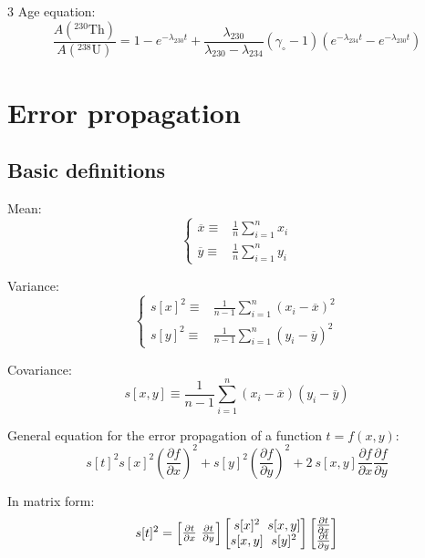 \documentclass{article}
\begin{document}
\begin{multicols}{3}
Age equation:
\begin{equation}
  \frac{A(^{230}\mbox{Th})}{A(^{238}\mbox{U})} = 1 - e^{-\lambda_{230}t} +
  \frac{\lambda_{230}}{\lambda_{230}-\lambda_{234}} (\gamma_\circ-1)
\left(e^{-\lambda_{234}t}-e^{-\lambda_{230}t}\right)
\label{eq:230238}
\end{equation}

\section{Error propagation}
\label{ch:error-propagation}

\subsection{Basic definitions}
\label{sec:summarystatistics}

Mean:
\begin{equation}
\left\{
\begin{array}{rl}
\overline{x} \equiv & \frac{1}{n} \sum_{i=1}^{n} x_i\\
\overline{y} \equiv & \frac{1}{n} \sum_{i=1}^{n} y_i
\end{array}
\right.
\label{eq:mean}
\end{equation}

Variance:
\begin{equation}
\left\{
\begin{array}{rl}
s[x]^2 \equiv & \frac{1}{n-1} \sum_{i=1}^{n} (x_i-\overline{x})^2\\
s[y]^2 \equiv & \frac{1}{n-1} \sum_{i=1}^{n} (y_i-\overline{y})^2
\end{array}
\right.
\label{eq:variance}
\end{equation}

Covariance:
\begin{equation}
s[x,y] \equiv \frac{1}{n-1} \sum_{i=1}^{n} (x_i-\overline{x})(y_i-\overline{y})
\label{eq:covariance}
\end{equation}

General equation for the error propagation of a function $t=f(x,y)$:
\begin{equation}
s[t]^2 s[x]^2 \left(\frac{\partial f}{\partial x}\right)^2 +
s[y]^2 \left(\frac{\partial f}{\partial y}\right)^2
+ 2~s[x,y] \frac{\partial f}{\partial x} \frac{\partial f}{\partial y} \label{eq:s2t}
\end{equation}

In matrix form:
\begin{equation}
s[t]^2 = 
\left[
\begin{array}{@{}c@{~}c@{}}
\frac{\partial t}{\partial x}&\frac{\partial t}{\partial y}
\end{array}
\right]
\left[
\begin{array}{@{}c@{~}c@{}}
s[x]^2 & s[x,y]\\
s[x,y] & s[y]^2
\end{array}
\right]
\left[
\begin{array}{@{}c@{}}
\frac{\partial t}{\partial x} \\
\frac{\partial t}{\partial y}
\end{array}
\right]
\label{eq:s2tmatrix}
\end{equation}


\end{multicols}
\end{document}
